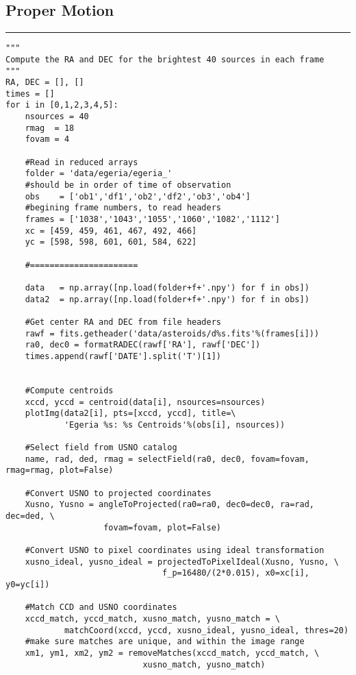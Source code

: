\documentclass[preprint]{aastex62}
\begin{document}
\subsection{Proper Motion} \label{code:proper_motion}
\hrule
\begin{lstlisting}
"""
Compute the RA and DEC for the brightest 40 sources in each frame
"""
RA, DEC = [], []
times = []
for i in [0,1,2,3,4,5]:
    nsources = 40
    rmag  = 18
    fovam = 4

    #Read in reduced arrays
    folder = 'data/egeria/egeria_'
    #should be in order of time of observation
    obs    = ['ob1','df1','ob2','df2','ob3','ob4'] 
    #begining frame numbers, to read headers
    frames = ['1038','1043','1055','1060','1082','1112'] 
    xc = [459, 459, 461, 467, 492, 466]
    yc = [598, 598, 601, 601, 584, 622]

    #======================

    data   = np.array([np.load(folder+f+'.npy') for f in obs])
    data2  = np.array([np.load(folder+f+'.npy') for f in obs])

    #Get center RA and DEC from file headers
    rawf = fits.getheader('data/asteroids/d%s.fits'%(frames[i]))
    ra0, dec0 = formatRADEC(rawf['RA'], rawf['DEC'])
    times.append(rawf['DATE'].split('T')[1])

    
    #Compute centroids 
    xccd, yccd = centroid(data[i], nsources=nsources)
    plotImg(data2[i], pts=[xccd, yccd], title=\
            'Egeria %s: %s Centroids'%(obs[i], nsources))
  
    #Select field from USNO catalog
    name, rad, ded, rmag = selectField(ra0, dec0, fovam=fovam, rmag=rmag, plot=False)
    
    #Convert USNO to projected coordinates
    Xusno, Yusno = angleToProjected(ra0=ra0, dec0=dec0, ra=rad, dec=ded, \
                    fovam=fovam, plot=False)

    #Convert USNO to pixel coordinates using ideal transformation
    xusno_ideal, yusno_ideal = projectedToPixelIdeal(Xusno, Yusno, \
                                f_p=16480/(2*0.015), x0=xc[i], y0=yc[i])

    #Match CCD and USNO coordinates
    xccd_match, yccd_match, xusno_match, yusno_match = \
            matchCoord(xccd, yccd, xusno_ideal, yusno_ideal, thres=20)
    #make sure matches are unique, and within the image range
    xm1, ym1, xm2, ym2 = removeMatches(xccd_match, yccd_match, \
                            xusno_match, yusno_match)
    

\end{lstlisting}
\end{document}
